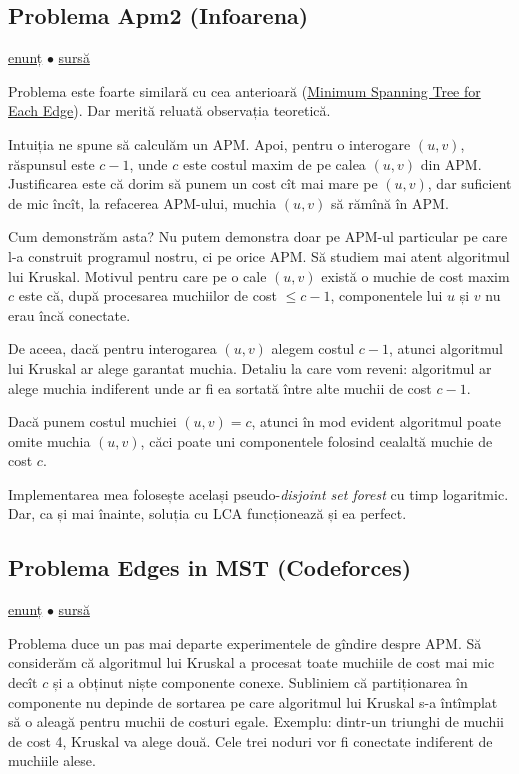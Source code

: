\documentclass[../main.tex]{subfiles}
\begin{document}
\subsection{Problema Apm2 (Infoarena)}
\label{problem:apm2}

\href{https://infoarena.ro/problema/apm2}{enunț}
$\bullet$
\hyperref[code:apm2]{sursă}

Problema este foarte similară cu cea anterioară (\hyperref[problem:mst-for-each-edge]{Minimum Spanning Tree for Each Edge}). Dar merită reluată observația teoretică.

Intuiția ne spune să calculăm un APM. Apoi, pentru o interogare $(u, v)$, răspunsul este $c - 1$, unde $c$ este costul maxim de pe calea $(u, v)$ din APM. Justificarea este că dorim să punem un cost cît mai mare pe $(u, v)$, dar suficient de mic încît, la refacerea APM-ului, muchia $(u, v)$ să rămînă în APM.

Cum demonstrăm asta? Nu putem demonstra doar pe APM-ul particular pe care l-a construit programul nostru, ci pe orice APM. Să studiem mai atent algoritmul lui Kruskal. Motivul pentru care pe o cale $(u,v)$ există o muchie de cost maxim $c$ este că, după procesarea muchiilor de cost $\leq c-1$, componentele lui $u$ și $v$ nu erau încă conectate.

De aceea, dacă pentru interogarea $(u,v)$ alegem costul $c-1$, atunci algoritmul lui Kruskal ar alege garantat muchia. Detaliu la care vom reveni: algoritmul ar alege muchia indiferent unde ar fi ea sortată între alte muchii de cost $c-1$.

Dacă punem costul muchiei $(u, v) = c$, atunci în mod evident algoritmul poate omite muchia $(u, v)$, căci poate uni componentele folosind cealaltă muchie de cost $c$.

Implementarea mea folosește același pseudo-\textit{disjoint set forest} cu timp logaritmic. Dar, ca și mai înainte, soluția cu LCA funcționează și ea perfect.

\subsection{Problema Edges in MST (Codeforces)}
\label{problem:edges-in-mst}

\href{https://codeforces.com/contest/160/problem/D}{enunț}
$\bullet$
\hyperref[code:edges-in-mst]{sursă}

Problema duce un pas mai departe experimentele de gîndire despre APM. Să considerăm că algoritmul lui Kruskal a procesat toate muchiile de cost mai mic decît $c$ și a obținut niște componente conexe. Subliniem că partiționarea în componente nu depinde de sortarea pe care algoritmul lui Kruskal s-a întîmplat să o aleagă pentru muchii de costuri egale. Exemplu: dintr-un triunghi de muchii de cost 4, Kruskal va alege două. Cele trei noduri vor fi conectate indiferent de muchiile alese.
\end{document}
